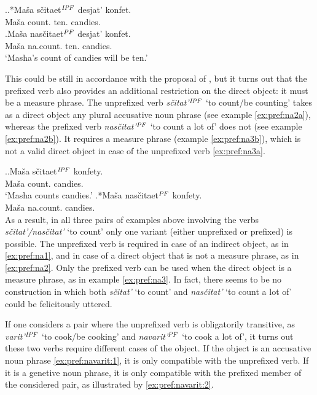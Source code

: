 \ex.\label{ex:pref:na2}\ag.*Ma\v{s}a s\v{c}itaet$^{\mathit{IPF}}$ desjat' konfet.\label{ex:pref:na2a}\\
Ma\v{s}a count. ten. candies.\\
\bg.\label{ex:pref:na2b}Ma\v{s}a nas\v{c}itaet$^{\mathit{PF}}$ desjat' konfet.\\
Ma\v{s}a na.count. ten. candies.\\
\vspace{0.5em}
`Masha's count of candies will be ten.'

This could be still in accordance with the proposal of \citet{Tatevosov:09}, but it turns out that the prefixed verb also provides an additional restriction on the direct object: it must be a measure phrase. The unprefixed verb \textit{s\v{c}itat'}$^{\mathit{IPF}}$ `to count/be counting' takes as a direct object any plural accusative noun phrase (see example \ref{ex:pref:na2a}), whereas the prefixed verb \textit{nas\v{c}itat'}$^{\mathit{PF}}$ `to count a lot of' does not (see example \ref{ex:pref:na2b}). It requires a measure phrase (example \ref{ex:pref:na3b}), which is not a valid direct object in case of the unprefixed verb \ref{ex:pref:na3a}. 

\ex.\label{ex:pref:na3}\ag.\label{ex:pref:na3a}Ma\v{s}a s\v{c}itaet$^{\mathit{IPF}}$ konfety.\\
Ma\v{s}a count. candies.\\
\vspace{0.5em}
`Masha counts candies.'
\bg.*Ma\v{s}a nas\v{c}itaet$^{\mathit{PF}}$ konfety.\label{ex:pref:na3b}\\
Ma\v{s}a na.count. candies.\\

As a result, in all three pairs of examples above involving the verbs \textit{s\v{c}itat'/nas\v{c}itat'} `to count' only one variant (either unprefixed or prefixed) is possible. The unprefixed verb is required in case of an indirect object, as in \ref{ex:pref:na1}, and in case of a direct object that is not a measure phrase, as in \ref{ex:pref:na2}. Only the prefixed verb can be used when the direct object is a measure phrase, as in example \ref{ex:pref:na3}. In fact, there seems to be no construction in which both \textit{s\v{c}itat'} `to count' and \textit{nas\v{c}itat'} `to count a lot of' could be felicitously uttered.

If one considers a pair where the unprefixed verb is obligatorily transitive, as \textit{varit'}$^{\mathit{IPF}}$ `to cook/be cooking' and \textit{navarit'}$^{\mathit{PF}}$ `to cook a lot of', it turns out these two verbs require different cases of the object. If the object is an accusative noun phrase \ref{ex:pref:navarit:1}, it is only compatible with the unprefixed verb. If it is a genetive noun phrase, it is only compatible with the prefixed member of the considered pair, as illustrated by \ref{ex:pref:navarit:2}.

